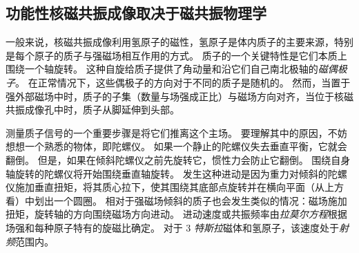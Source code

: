 \subsection{功能性核磁共振成像取决于磁共振物理学}

一般来说，核磁共振成像利用氢原子的磁性，氢原子是体内质子的主要来源，特别是每个原子的质子与强磁场相互作用的方式。
质子的一个关键特性是它们本质上围绕一个轴旋转。
这种自旋给质子提供了角动量和沿它们自己南北极轴的\textit{磁偶极子}。
在正常情况下，这些偶极子的方向对于不同的质子是随机的。
然而，当置于强外部磁场中时，质子的子集（数量与场强成正比）与磁场方向对齐，当位于核磁共振成像孔中时，质子从脚延伸到头部。



测量质子信号的一个重要步骤是将它们推离这个主场。
要理解其中的原因，不妨想想一个熟悉的物体，即陀螺仪。
如果一个静止的陀螺仪失去垂直平衡，它就会翻倒。
但是，如果在倾斜陀螺仪之前先旋转它，惯性力会防止它翻倒。
围绕自身轴旋转的陀螺仪将开始围绕垂直轴旋转。
发生这种进动是因为重力对倾斜的陀螺仪施加垂直扭矩，将其质心拉下，使其围绕其底部点旋转并在横向平面（从上方看）中划出一个圆圈。 
相对于强磁场倾斜的质子也会发生类似的情况：磁场施加扭矩，旋转轴的方向围绕磁场方向进动。
进动速度或共振频率由\textit{拉莫尔方程}根据场强和每种原子特有的旋磁比确定。 
对于 3 \textit{特斯拉}磁体和氢原子，该速度处于\textit{射频}范围内。


